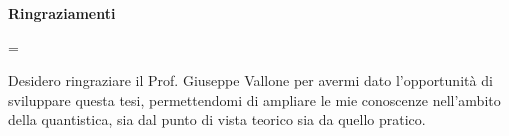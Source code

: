 \cleardoublepage
\thispagestyle{empty}
\vspace*{\fill}
\centerline{\large\bfseries Ringraziamenti}
\nobreak
\vspace{1pc}
\begingroup\small
{}\textwidth
\rightskip=\leftskip

Desidero ringraziare il Prof. Giuseppe Vallone per avermi
dato l’opportunità di sviluppare questa tesi, permettendomi di ampliare
le mie conoscenze nell’ambito della quantistica, sia
dal punto di vista teorico sia da quello pratico.
\par\endgroup
\vspace{\fill}
\clearpage
